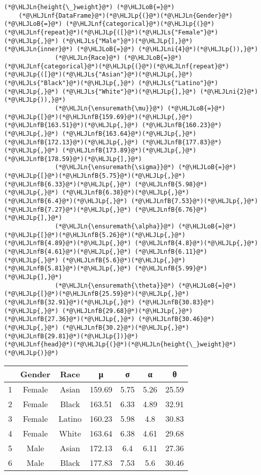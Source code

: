 \documentclass[12pt,a4paper]{article}
\newcommand{\HLJLn}[1]{#1}
\newcommand{\HLJLnf}[1]{\textcolor[RGB]{66,102,213}{#1}}
\newcommand{\HLJLs}[1]{\textcolor[RGB]{201,61,57}{#1}}
\newcommand{\HLJLnfB}[1]{\textcolor[RGB]{59,151,46}{#1}}
\newcommand{\HLJLni}[1]{\textcolor[RGB]{59,151,46}{#1}}
\newcommand{\HLJLoB}[1]{\textcolor[RGB]{102,102,102}{\textbf{#1}}}
\newcommand{\HLJLp}[1]{#1}
\begin{document}
\begin{lstlisting}
(*@\HLJLn{height{\_}weight}@*) (*@\HLJLoB{=}@*)
    (*@\HLJLnf{DataFrame}@*)(*@\HLJLp{(}@*)(*@\HLJLn{Gender}@*) (*@\HLJLoB{=}@*) (*@\HLJLnf{categorical}@*)(*@\HLJLp{(}@*)(*@\HLJLnf{repeat}@*)(*@\HLJLp{([}@*)(*@\HLJLs{"Female"}@*)(*@\HLJLp{,}@*) (*@\HLJLs{"Male"}@*)(*@\HLJLp{],}@*) (*@\HLJLn{inner}@*) (*@\HLJLoB{=}@*) (*@\HLJLni{4}@*)(*@\HLJLp{)),}@*)
              (*@\HLJLn{Race}@*) (*@\HLJLoB{=}@*) (*@\HLJLnf{categorical}@*)(*@\HLJLp{(}@*)(*@\HLJLnf{repeat}@*)(*@\HLJLp{([}@*)(*@\HLJLs{"Asian"}@*)(*@\HLJLp{,}@*) (*@\HLJLs{"Black"}@*)(*@\HLJLp{,}@*) (*@\HLJLs{"Latino"}@*)(*@\HLJLp{,}@*) (*@\HLJLs{"White"}@*)(*@\HLJLp{],}@*) (*@\HLJLni{2}@*)(*@\HLJLp{)),}@*)
              (*@\HLJLn{\ensuremath{\mu}}@*) (*@\HLJLoB{=}@*) (*@\HLJLp{[}@*)(*@\HLJLnfB{159.69}@*)(*@\HLJLp{,}@*) (*@\HLJLnfB{163.51}@*)(*@\HLJLp{,}@*) (*@\HLJLnfB{160.23}@*)(*@\HLJLp{,}@*) (*@\HLJLnfB{163.64}@*)(*@\HLJLp{,}@*) (*@\HLJLnfB{172.13}@*)(*@\HLJLp{,}@*) (*@\HLJLnfB{177.83}@*)(*@\HLJLp{,}@*) (*@\HLJLnfB{173.89}@*)(*@\HLJLp{,}@*) (*@\HLJLnfB{178.59}@*)(*@\HLJLp{],}@*)
              (*@\HLJLn{\ensuremath{\sigma}}@*) (*@\HLJLoB{=}@*) (*@\HLJLp{[}@*)(*@\HLJLnfB{5.75}@*)(*@\HLJLp{,}@*) (*@\HLJLnfB{6.33}@*)(*@\HLJLp{,}@*) (*@\HLJLnfB{5.98}@*)(*@\HLJLp{,}@*) (*@\HLJLnfB{6.38}@*)(*@\HLJLp{,}@*) (*@\HLJLnfB{6.4}@*)(*@\HLJLp{,}@*) (*@\HLJLnfB{7.53}@*)(*@\HLJLp{,}@*) (*@\HLJLnfB{7.27}@*)(*@\HLJLp{,}@*) (*@\HLJLnfB{6.76}@*)(*@\HLJLp{],}@*)
              (*@\HLJLn{\ensuremath{\alpha}}@*) (*@\HLJLoB{=}@*) (*@\HLJLp{[}@*)(*@\HLJLnfB{5.26}@*)(*@\HLJLp{,}@*) (*@\HLJLnfB{4.89}@*)(*@\HLJLp{,}@*) (*@\HLJLnfB{4.8}@*)(*@\HLJLp{,}@*) (*@\HLJLnfB{4.61}@*)(*@\HLJLp{,}@*) (*@\HLJLnfB{6.11}@*)(*@\HLJLp{,}@*) (*@\HLJLnfB{5.6}@*)(*@\HLJLp{,}@*) (*@\HLJLnfB{5.81}@*)(*@\HLJLp{,}@*) (*@\HLJLnfB{5.99}@*)(*@\HLJLp{],}@*)
              (*@\HLJLn{\ensuremath{\theta}}@*) (*@\HLJLoB{=}@*) (*@\HLJLp{[}@*)(*@\HLJLnfB{25.59}@*)(*@\HLJLp{,}@*) (*@\HLJLnfB{32.91}@*)(*@\HLJLp{,}@*) (*@\HLJLnfB{30.83}@*)(*@\HLJLp{,}@*) (*@\HLJLnfB{29.68}@*)(*@\HLJLp{,}@*) (*@\HLJLnfB{27.36}@*)(*@\HLJLp{,}@*) (*@\HLJLnfB{30.46}@*)(*@\HLJLp{,}@*) (*@\HLJLnfB{30.2}@*)(*@\HLJLp{,}@*) (*@\HLJLnfB{29.81}@*)(*@\HLJLp{])}@*)
(*@\HLJLnf{head}@*)(*@\HLJLp{(}@*)(*@\HLJLn{height{\_}weight}@*)(*@\HLJLp{)}@*)
\end{lstlisting}


\begin{tabular}{r|cccccc}
	& Gender & Race & μ & σ & α & θ\\
	\hline
	1 & Female & Asian & 159.69 & 5.75 & 5.26 & 25.59 \\
	2 & Female & Black & 163.51 & 6.33 & 4.89 & 32.91 \\
	3 & Female & Latino & 160.23 & 5.98 & 4.8 & 30.83 \\
	4 & Female & White & 163.64 & 6.38 & 4.61 & 29.68 \\
	5 & Male & Asian & 172.13 & 6.4 & 6.11 & 27.36 \\
	6 & Male & Black & 177.83 & 7.53 & 5.6 & 30.46 \\
\end{tabular}
\end{document}

